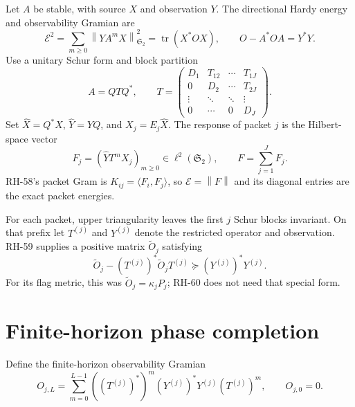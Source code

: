 \documentclass[11pt]{article}
\theoremstyle{remark}
\newcommand{\norm}[1]{\left\lVert#1\right\rVert}
\newcommand{\HS}{\mathfrak S_2}
\newcommand{\cE}{\mathcal E}
\newcommand{\tr}{\operatorname{tr}}
\begin{document}
Let $A$ be stable, with source $X$ and observation $Y$.  The directional
Hardy energy and observability Gramian are
\begin{equation}
 \cE^2=\sum_{m\ge0}\norm{YA^mX}_{\HS}^2=\tr(X^*OX),
 \qquad O-A^*OA=Y^*Y.
 \label{eq:hardy}
\end{equation}
Use a unitary Schur form and block partition
\citep{GolubVanLoan2013,HornJohnson2013}
\begin{equation}
 A=QTQ^*,\qquad
 T=\begin{pmatrix}
 D_1&T_{12}&\cdots&T_{1J}\\
 0&D_2&\cdots&T_{2J}\\
 \vdots&\ddots&\ddots&\vdots\\
 0&\cdots&0&D_J
 \end{pmatrix}.
 \label{eq:schur}
\end{equation}
Set $\widehat X=Q^*X$, $\widehat Y=YQ$, and $X_j=E_j\widehat X$.
The response of packet $j$ is the Hilbert-space vector
\begin{equation}
 F_j=(\widehat YT^mX_j)_{m\ge0}\in\ell^2(\HS),
 \qquad F=\sum_{j=1}^JF_j.
 \label{eq:responses}
\end{equation}
RH-58's packet Gram is $K_{ij}=\langle F_i,F_j\rangle$, so
$\cE=\norm F$ and its diagonal entries are the exact packet energies.

For each packet, upper triangularity leaves the first $j$ Schur blocks
invariant.  On that prefix let $T^{(j)}$ and $Y^{(j)}$ denote the restricted
operator and observation.  RH-59 supplies a positive matrix
$\widetilde O_j$ satisfying
\begin{equation}
\widetilde O_j-(T^{(j)})^*\widetilde O_jT^{(j)}
 \succeq (Y^{(j)})^*Y^{(j)}.
 \label{eq:supersolution}
\end{equation}
For its flag metric, this was $\widetilde O_j=\kappa_jP_j$; RH-60 does not
need that special form.

\section{Finite-horizon phase completion}
\label{sec:completion}

Define the finite-horizon observability Gramian
\begin{equation}
 O_{j,L}=\sum_{m=0}^{L-1}
 ((T^{(j)})^*)^m(Y^{(j)})^*Y^{(j)}(T^{(j)})^m,
 \qquad O_{j,0}=0.
 \label{eq:finite-observation}
\end{equation}
\end{document}
